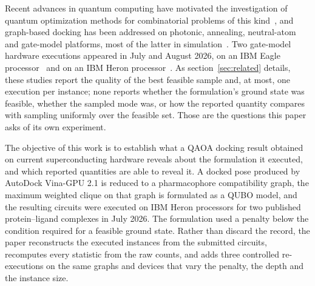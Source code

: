 \documentclass{iopjournal}
\begin{document}
Recent advances in quantum computing have motivated the investigation of quantum optimization methods for combinatorial problems of this kind~\cite{preskill2018nisq,farhi2014qaoa}, and graph-based docking has been addressed on photonic, annealing, neutral-atom and gate-model platforms, most of the latter in simulation~\cite{banchi2020gbs,triuzzi2025weighted,garrigues2026scalable,ding2024docking,papalitsas2025qaoa}. Two gate-model hardware executions appeared in July and August 2026, on an IBM Eagle processor~\cite{zheng2026qscore} and on an IBM Heron processor~\cite{chen2026fbe}. As section~\ref{sec:related} details, these studies report the quality of the best feasible sample and, at most, one execution per instance; none reports whether the formulation's ground state was feasible, whether the sampled mode was, or how the reported quantity compares with sampling uniformly over the feasible set. Those are the questions this paper asks of its own experiment.

The objective of this work is to establish what a QAOA docking result obtained on current superconducting hardware reveals about the formulation it executed, and which reported quantities are able to reveal it. A docked pose produced by AutoDock Vina-GPU 2.1 is reduced to a pharmacophore compatibility graph, the maximum weighted clique on that graph is formulated as a QUBO model, and the resulting circuits were executed on IBM Heron processors for two published protein--ligand complexes in July 2026. The formulation used a penalty below the condition required for a feasible ground state. Rather than discard the record, the paper reconstructs the executed instances from the submitted circuits, recomputes every statistic from the raw counts, and adds three controlled re-executions on the same graphs and devices that vary the penalty, the depth and the instance size.
\end{document}
